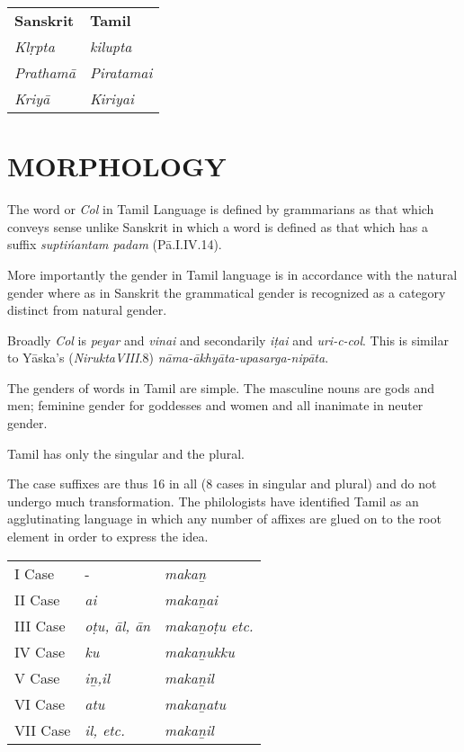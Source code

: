 \begin{longtable}{p{2.5cm}p{2.5cm}}
\textbf{Sanskrit} & \textbf{Tamil} \\
\textit{Klṛpta} & \textit{kilupta} \\
\textit{Prathamā} & \textit{Piratamai} \\
\textit{Kriyā} & \textit{Kiriyai} \\
\end{longtable}


\section*{MORPHOLOGY}

The word or \textit{Col} in Tamil Language is defined by grammarians as that which conveys sense unlike Sanskrit in which a word is defined as that which has a suffix \textit{suptińantam padam} (Pā.I.IV.14).

More importantly the gender in Tamil language is in accordance with the natural gender where as in Sanskrit the grammatical gender is recognized as a category distinct from natural gender.

Broadly \textit{Col} is \textit{peyar} and \textit{vinai} and secondarily \textit{iṭai} and \textit{uri-c-col}. This is similar to Yāska’s (\textit{NiruktaVIII}.8) \textit{nāma-ākhyāta-upasarga-nipāta}.

The genders of words in Tamil are simple. The masculine nouns are gods and men; feminine gender for goddesses and women and all inanimate in neuter gender.

Tamil has only the singular and the plural.

The case suffixes are thus 16 in all (8 cases in singular and plural) and do not undergo much transformation. The philologists have identified Tamil as an agglutinating language in which any number of affixes are glued on to the root element in order to express the idea.

\newpage

\begin{longtable}{lll}
I Case & - & \textit{makaṉ} \\
II Case  & \textit{ai} & \textit{makaṉai} \\
III Case & \textit{oṭu, āl, ān} & \textit{makaṉoṭu etc.} \\
IV Case & \textit{ku} & \textit{makaṉukku} \\
V Case & \textit{iṉ,il} & \textit{makaṉil} \\
VI Case & \textit{atu} & \textit{makaṉatu} \\
VII Case & \textit{il, etc.} & \textit{makaṉil} \\
\end{longtable}

